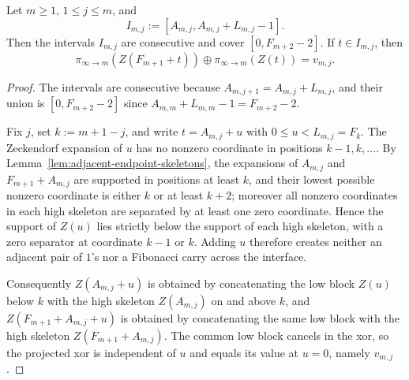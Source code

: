 \begin{lemma}
\label{lem:adjacent-no-carry-stability}
Let $m\ge 1$, $1\le j\le m$, and
\[
I_{m,j}:=[A_{m,j},A_{m,j}+L_{m,j}-1].
\]
Then the intervals $I_{m,j}$ are consecutive and cover $[0,F_{m+2}-2]$.  If
$t\in I_{m,j}$, then
\[
\pi_{\infty\to m}(Z(F_{m+1}+t))
\oplus
\pi_{\infty\to m}(Z(t))=v_{m,j}.
\]
\end{lemma}

\begin{proof}
The intervals are consecutive because $A_{m,j+1}=A_{m,j}+L_{m,j}$, and their
union is $[0,F_{m+2}-2]$ since $A_{m,m}+L_{m,m}-1=F_{m+2}-2$.

Fix $j$, set $k:=m+1-j$, and write $t=A_{m,j}+u$ with $0\le u<L_{m,j}=F_k$.
The Zeckendorf expansion of $u$ has no nonzero coordinate in positions
$k-1,k,\dots$.  By Lemma~\ref{lem:adjacent-endpoint-skeletons}, the expansions
of $A_{m,j}$ and $F_{m+1}+A_{m,j}$ are supported in positions at least $k$, and
their lowest possible nonzero coordinate is either $k$ or at least $k+2$;
moreover all nonzero coordinates in each high skeleton are separated by at
least one zero coordinate.  Hence the support of $Z(u)$ lies strictly below the
support of each high skeleton, with a zero separator at coordinate $k-1$ or
$k$.  Adding $u$ therefore creates neither an adjacent pair of $1$'s nor a
Fibonacci carry across the interface.

Consequently $Z(A_{m,j}+u)$ is obtained by concatenating the low block $Z(u)$
below $k$ with the high skeleton $Z(A_{m,j})$ on and above $k$, and
$Z(F_{m+1}+A_{m,j}+u)$ is obtained by concatenating the same low block with the
high skeleton $Z(F_{m+1}+A_{m,j})$.  The common low block cancels in the xor, so
the projected xor is independent of $u$ and equals its value at $u=0$, namely
$v_{m,j}$.
\end{proof}

